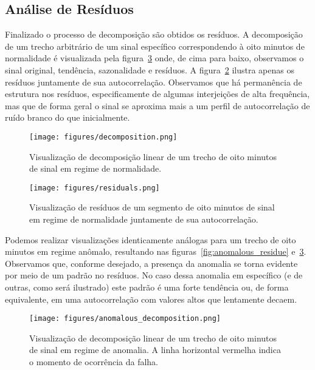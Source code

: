 \subsection{Análise de Resíduos}

Finalizado o processo de decomposição são obtidos os resíduos. A decomposição
de um trecho arbitrário de um sinal específico correspondendo à oito minutos de
normalidade é visualizada pela figura~\ref{fig:decomposition} onde, de cima
para baixo, observamos o sinal original, tendência, sazonalidade e resíduos. A
figura~\ref{fig:normal_residue} ilustra apenas os resíduos juntamente de sua
autocorrelação. Observamos que há permanência de estrutura nos resíduos,
especificamente de algumas interjeições de alta frequência, mas que de forma
geral o sinal se aproxima mais a um perfil de autocorrelação de ruído branco
do que inicialmente.

\begin{figure}[H]
    \centering
    \texttt{[image: figures/decomposition.png]}
    \caption{Visualização de decomposição linear de um trecho de oito
    minutos de sinal em regime de normalidade.}
    \label{fig:decomposition}
\end{figure}

\begin{figure}[H]
    \centering
    \texttt{[image: figures/residuals.png]}
    \caption{Visualização de resíduos de um segmento de oito minutos de sinal
    em regime de normalidade juntamente de sua autocorrelação.}
    \label{fig:normal_residue}
\end{figure}

Podemos realizar visualizações identicamente análogas para um trecho de oito
minutos em regime anômalo, resultando nas figuras~\ref{fig:anomalous_residue}
e~\ref{fig:decomposition}. Observamos que, conforme desejado, a presença da
anomalia se torna evidente por meio de um padrão no resíduos. No caso dessa
anomalia em específico (e de outras, como será ilustrado) este padrão é uma
forte tendência ou, de forma equivalente, em uma autocorrelação com valores
altos que lentamente decaem.

\begin{figure}[H]
    \centering
    \texttt{[image: figures/anomalous\_decomposition.png]}
    \caption{Visualização de decomposição linear de um trecho de oito
    minutos de sinal em regime de anomalia. A linha horizontal vermelha
    indica o momento de ocorrência da falha.}
    \label{fig:decomposition}
\end{figure}

